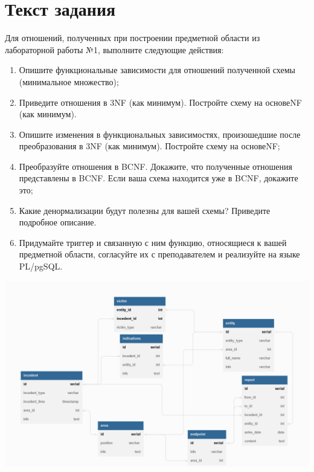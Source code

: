 \documentclass{article}
\begin{document}
\itmo[
  variant=371364,
  labn=3,
  discipline=Информационные системы и базы данных,
  group=P3115,
  student=Владимир Мацюк,
  teacher=Горбунов Михаил Витальевич,
  year=2023,
  logo=../../lib/img/itmo.png
]
\lstset{language=SQL}

\section{Текст задания}
Для отношений, полученных при построении предметной области из лабораторной работы №1, выполните следующие действия:
\begin{enumerate}
  \item Опишите функциональные зависимости для отношений полученной схемы (минимальное множество);
  \item Приведите отношения в 3NF (как минимум). Постройте схему на основеNF (как минимум).
  \item Опишите изменения в функциональных зависимостях, произошедшие после преобразования в 3NF (как минимум). Постройте схему на основеNF;
  \item Преобразуйте отношения в BCNF. Докажите, что полученные отношения представлены в BCNF. Если ваша схема находится уже в BCNF, докажите это;
  \item Какие денормализации будут полезны для вашей схемы? Приведите подробное описание.
  \item Придумайте триггер и связанную с ним функцию, относящиеся к вашей предметной области, согласуйте их с преподавателем и реализуйте на языке PL/pgSQL.
\end{enumerate}

\includegraphics[width=\textwidth]{dbdiagram.png}
\end{document}
